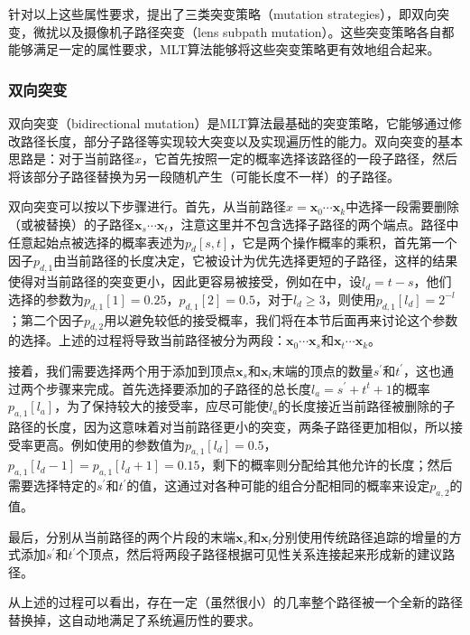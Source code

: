 针对以上这些属性要求，\cite{a:MetropolisLightTransport}提出了三类突变策略（mutation strategies），即双向突变，微扰以及摄像机子路径突变（lens subpath mutation）。这些突变策略各自都能够满足一定的属性要求，MLT算法能够将这些突变策略更有效地组合起来。




\subsubsection{双向突变}
双向突变（bidirectional mutation）是MLT算法最基础的突变策略，它能够通过修改路径长度，部分子路径等实现较大突变以及实现遍历性的能力。双向突变的基本思路是：对于当前路径${x}$，它首先按照一定的概率选择该路径的一段子路径，然后将该部分子路径替换为另一段随机产生（可能长度不一样）的子路径。

双向突变可以按以下步骤进行。首先，从当前路径${x}=\mathbf{x}_0\cdots\mathbf{x}_k$中选择一段需要删除（或被替换）的子路径$\mathbf{x}_s\cdots\mathbf{x}_t$，注意这里并不包含选择子路径的两个端点。路径中任意起始点被选择的概率表述为$p_d[s,t]$，它是两个操作概率的乘积，首先第一个因子$p_{d,1}$由当前路径的长度决定，它被设计为优先选择更短的子路径，这样的结果使得对当前路径的突变更小，因此更容易被接受，例如在\cite{a:MetropolisLightTransport}中，设$l_d=t-s$，他们选择的参数为$p_{d,1}[1]=0.25$，$p_{d,1}[2]=0.5$，对于$l_d\geq 3$，则使用$p_{d,1}[l_d]=2^{-l}$；第二个因子$p_{d,2}$用以避免较低的接受概率，我们将在本节后面再来讨论这个参数的选择。上述的过程将导致当前路径被分为两段：$\mathbf{x}_0\cdots\mathbf{x}_s$和$\mathbf{x}_t\cdots\mathbf{x}_k$。

接着，我们需要选择两个用于添加到顶点$\mathbf{x}_s$和$\mathbf{x}_t$末端的顶点的数量$s^{'}$和$t^{'}$，这也通过两个步骤来完成。首先选择要添加的子路径的总长度$l_a=s^{'}+t^{t}+1$的概率$p_{a,1}[l_a]$，为了保持较大的接受率，应尽可能使$l_a$的长度接近当前路径被删除的子路径的长度，因为这意味着对当前路径更小的突变，两条子路径更加相似，所以接受率更高。例如\cite{a:MetropolisLightTransport}使用的参数值为$p_{a,1}[l_d]=0.5$，$p_{a,1}[l_d-1]=p_{a,1}[l_d+1]=0.15$，剩下的概率则分配给其他允许的长度；然后需要选择特定的$s^{'}$和$t^{'}$的值，这通过对各种可能的组合分配相同的概率来设定$p_{a,2}$的值。

最后，分别从当前路径的两个片段的末端$\mathbf{x}_s$和$\mathbf{x}_t$分别使用传统路径追踪的增量的方式添加$s^{'}$和$t^{'}$个顶点，然后将两段子路径根据可见性关系连接起来形成新的建议路径。

从上述的过程可以看出，存在一定（虽然很小）的几率整个路径被一个全新的路径替换掉，这自动地满足了系统遍历性的要求。



